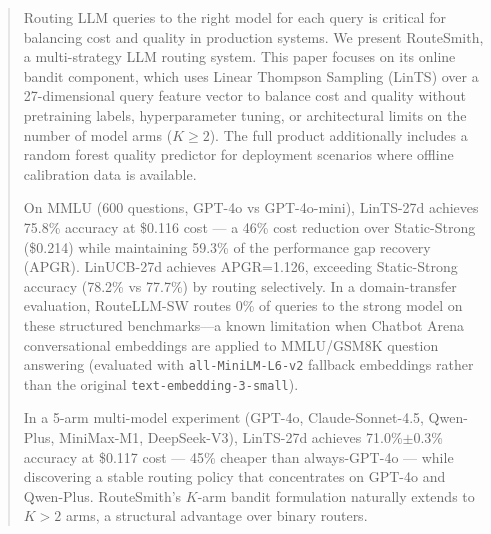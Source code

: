 \begin{abstract}
Routing LLM queries to the right model for each query is critical for balancing cost and quality in production systems.
We present RouteSmith, a multi-strategy LLM routing system. This paper focuses on its online bandit component, which uses Linear Thompson Sampling (LinTS) over a 27-dimensional query feature vector to balance cost and quality without pretraining labels, hyperparameter tuning, or architectural limits on the number of model arms ($K \geq 2$). The full product additionally includes a random forest quality predictor for deployment scenarios where offline calibration data is available.

On MMLU (600 questions, GPT-4o vs GPT-4o-mini), LinTS-27d achieves 75.8\% accuracy at \$0.116 cost --- a 46\% cost reduction over Static-Strong (\$0.214) while maintaining 59.3\% of the performance gap recovery (APGR).
LinUCB-27d achieves APGR=1.126, exceeding Static-Strong accuracy (78.2\% vs 77.7\%) by routing selectively.
In a domain-transfer evaluation, RouteLLM-SW routes 0\% of queries to the strong model on these structured benchmarks\mbox{---}a known limitation when Chatbot Arena conversational embeddings are applied to MMLU/GSM8K question answering (evaluated with \texttt{all-MiniLM-L6-v2} fallback embeddings rather than the original \texttt{text-embedding-3-small}).

In a 5-arm multi-model experiment (GPT-4o, Claude-Sonnet-4.5, Qwen-Plus, MiniMax-M1, DeepSeek-V3), LinTS-27d achieves 71.0\%$\pm$0.3\% accuracy at \$0.117 cost --- 45\% cheaper than always-GPT-4o --- while discovering a stable routing policy that concentrates on GPT-4o and Qwen-Plus.
RouteSmith's $K$-arm bandit formulation naturally extends to $K > 2$ arms, a structural advantage over binary routers.
\end{abstract}
